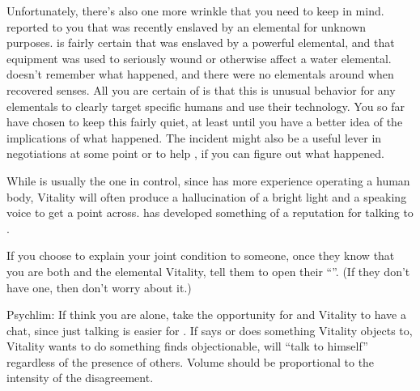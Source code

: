 \documentclass[char]{elementals}
\begin{document}
Unfortunately, there's also one more wrinkle that you need to keep in mind.  \cGD{} reported to you that \cGD{\they} was recently enslaved by an elemental for unknown purposes.  \cGD{\They} is fairly certain that \cGD{\they} was enslaved by a powerful elemental, and that \cGD{\their} equipment was used to seriously wound or otherwise affect a water elemental.  \cGD{} doesn't remember what happened, and there were no elementals around when \cGD{\they} recovered \cGD{\their} senses.  All you are certain of is that this is unusual behavior for any elementals to clearly target specific humans and use their technology.  You so far have chosen to keep this fairly quiet, at least until you have a better idea of the implications of what happened.  The incident might also be a useful lever in negotiations at some point or to help \cGD{}, if you can figure out what happened.

While \cAvatar{} is usually the one in control, since \cAvatar{\they} has more experience operating a human body, Vitality will often produce a hallucination of a bright light and a speaking voice to get a point across.  \cAvatar{} has developed something of a reputation for talking to \cAvatar{\themself}.



If you choose to explain your joint condition to someone, once they know that you are both \cAvatar{} and the elemental Vitality, tell them to open their ``\mUnstickAvatar{\MYname}''.  (If they don't have one, then don't worry about it.)

Psychlim:  If think you are alone, take the opportunity for \cAvatar{} and Vitality to have a chat, since just talking is easier for \cAvatar{}.  If \cAvatar{} says or does something Vitality objects to, Vitality wants \cAvatar{} to do something \cAvatar{\they} finds objectionable, \cAvatar{} will ``talk to himself'' regardless of the presence of others.  Volume should be proportional to the intensity of the disagreement.
\end{document}
